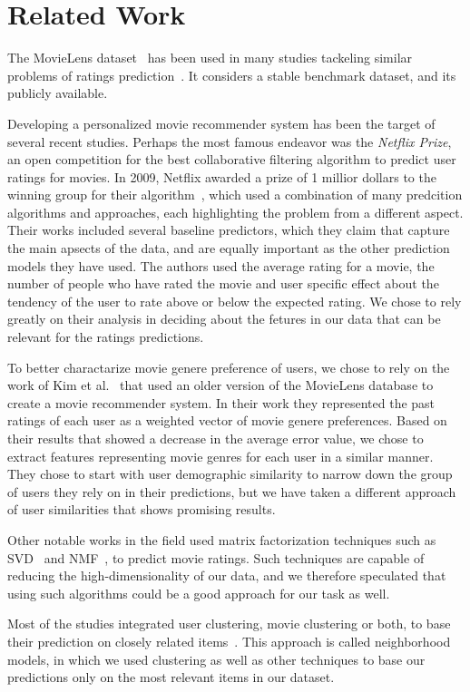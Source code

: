 \section{Related Work}

The MovieLens dataset~\cite{GroupLens,MovieLens} has been used in many studies tackeling similar problems of ratings prediction~\cite{5575081, zhang2006learning}. It considers a stable benchmark dataset, and its publicly available. 

Developing a personalized movie recommender system has been the target of several recent studies. Perhaps the most famous endeavor was the \textit{Netflix Prize}, an open competition for the best collaborative filtering algorithm to predict user ratings for movies. In 2009, Netflix awarded a prize of 1 millior dollars to the winning group for their algorithm~\cite{bell2007bellkor}, which used a combination of many predcition algorithms and approaches, each highlighting the problem from a different aspect. Their works included several baseline predictors, which they claim that capture the main apsects of the data, and are equally important as the other prediction models they have used. The authors used the average rating for a movie, the number of people who have rated the movie and user specific effect about the tendency of the user to rate above or below the expected rating. We chose to rely greatly on their analysis in deciding about the fetures in our data that can be relevant for the ratings predictions. 

To better charactarize movie genere preference of users, we chose to rely on the work of Kim et al.~\cite{5575081} that used an older version of the MovieLens database to create a movie recommender system. In their work they represented the past ratings of each user as a weighted vector of movie genere preferences. Based on their results that showed a decrease in the average error value, we chose to extract features representing movie genres for each user in a similar manner. They chose to start with user demographic similarity to narrow down the group of users they rely on in their predictions, but we have taken a different approach of user similarities that shows promising results. 

Other notable works in the field used matrix factorization techniques such as SVD~\cite{koren2009matrix, zhang2006learning} and NMF~\cite{nguyen2012modified, zhang2006learning}, to predict movie ratings. Such techniques are capable of reducing the high-dimensionality of our data, and we therefore speculated that using such algorithms could be a good approach for our task as well. 

Most of the studies integrated user clustering, movie clustering or both, to  base their prediction on closely related items~\cite{bell2007bellkor, 5575081, kim2012recommender}. This approach is called neighborhood models, in which we used clustering as well as other techniques to base our predictions only on the most relevant items in our dataset.